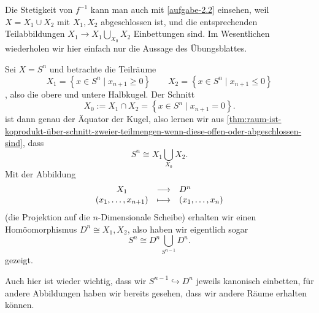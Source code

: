 \begin{remark*}
    Die Stetigkeit von $f^{-1}$ kann man auch mit \autoref{aufgabe-2.2} einsehen, weil $X = X_1 \cup X_2$ mit $X_1,X_2$ abgeschlossen ist, und die entsprechenden Teilabbildungen $X_1 \to X_1 \bigcup_{X_0} X_2$ Einbettungen sind. Im Wesentlichen wiederholen wir hier einfach nur die Aussage des Übungsblattes.
\end{remark*}

\begin{example}
    Sei $X = S^n$ und betrachte die Teilräume  \[
        X_1 = \left \{x\in S^n \mid  x_{n+1}\geq 0\right\} \qquad X_2 = \left \{x\in S^n \mid  x_{n+1} \leq 0\right\} 
    \]
    , also die obere und untere Halbkugel. Der Schnitt
    \[
    X_0 := X_1 \cap  X_2 = \left \{x\in S^n \mid  x_{n+1} = 0\right\} 
    .\] 
    ist dann genau der Äquator der Kugel, also lernen wir aus \autoref{thm:raum-ist-koprodukt-über-schnitt-zweier-teilmengen-wenn-diese-offen-oder-abgeschlossen-sind}, dass
     \[
    S^n \cong X_1 \bigcup_{X_0} X_2 
    .\] 
    Mit der Abbildung
        \begin{equation*}
        \begin{array}{c c l} 
        X_1 & \longrightarrow & D^n \\
        (x_1,\ldots,x_{n+1}) & \longmapsto &  (x_1,\ldots,x_n)
        \end{array}
    \end{equation*}
    (die Projektion auf die $n$-Dimensionale Scheibe) erhalten wir einen Homöomorphismus  $D^n \cong X_1, X_2$, also haben wir eigentlich sogar
    \[
    S^n \cong D^n \bigcup_{S^{n-1}} D^n
    .\] 
    gezeigt.
    \begin{warning}
        Auch hier ist wieder wichtig, dass wir $S^{n-1}\hookrightarrow D^n$ jeweils kanonisch einbetten, für andere Abbildungen haben wir bereits gesehen, dass wir andere Räume erhalten können.
    \end{warning}
\end{example}
